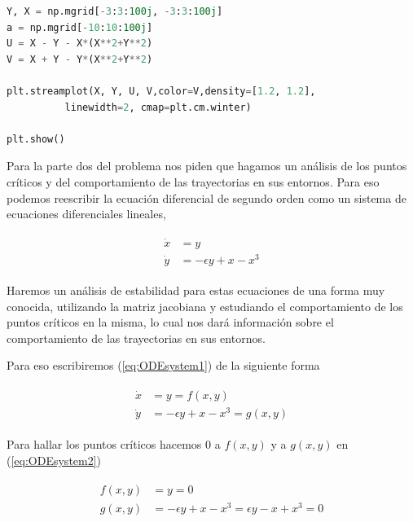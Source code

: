 \documentclass[a4paper,10pt]{article}
\begin{document}
\begin{lstlisting}[language=Python]
Y, X = np.mgrid[-3:3:100j, -3:3:100j]
a = np.mgrid[-10:10:100j]
U = X - Y - X*(X**2+Y**2)
V = X + Y - Y*(X**2+Y**2)

plt.streamplot(X, Y, U, V,color=V,density=[1.2, 1.2], 
	      linewidth=2, cmap=plt.cm.winter)

plt.show()
\end{lstlisting}

Para la parte dos del problema nos piden que hagamos un análisis de los puntos críticos
y del comportamiento de las trayectorias en sus entornos. Para eso podemos reescribir
la ecuación diferencial de segundo orden como un sistema de ecuaciones diferenciales
lineales,


\begin{align}
 \begin{split}
  \dot{x} &= y \\
  \dot{y} &= - \epsilon y + x - x^3
 \end{split}
 \label{eq:ODEsystem1}
\end{align}

Haremos un análisis de estabilidad para estas ecuaciones de una forma muy conocida, utilizando
la matriz jacobiana y estudiando el comportamiento de los puntos críticos en la misma,
lo cual nos dará información sobre el comportamiento de las trayectorias en sus entornos.

\vspace{.3cm}

Para eso escribiremos (\ref{eq:ODEsystem1}) de la siguiente forma

\begin{align}
 \begin{split}
  \dot{x} &= y = f(x,y)\\
  \dot{y} &= - \epsilon y + x - x^3 = g(x,y)
 \end{split}
 \label{eq:ODEsystem2}
\end{align}

Para hallar los puntos críticos hacemos $0$ a $f(x,y)$ y a $g(x,y)$ en (\ref{eq:ODEsystem2})

\begin{align}
 \begin{split}
  f(x,y) &= y = 0\\
  g(x,y) &= -\epsilon y + x - x^3 = \epsilon y -x + x^3  = 0
 \label{eq:ODEsystem3}
 \end{split}
\end{align}
\end{document}
